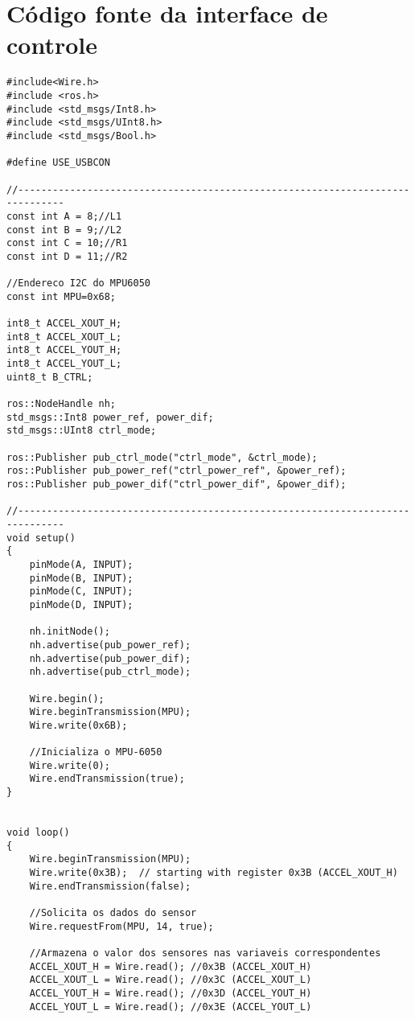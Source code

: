 \chapter{Código fonte da interface de controle}
\label{app:steering_wheel}
	
\lstset{language=C++}
\begin{lstlisting}
#include<Wire.h>
#include <ros.h>
#include <std_msgs/Int8.h>
#include <std_msgs/UInt8.h>
#include <std_msgs/Bool.h>

#define USE_USBCON

//------------------------------------------------------------------------------
const int A = 8;//L1
const int B = 9;//L2
const int C = 10;//R1
const int D = 11;//R2

//Endereco I2C do MPU6050
const int MPU=0x68;

int8_t ACCEL_XOUT_H;
int8_t ACCEL_XOUT_L;
int8_t ACCEL_YOUT_H;
int8_t ACCEL_YOUT_L;
uint8_t B_CTRL;

ros::NodeHandle nh;	
std_msgs::Int8 power_ref, power_dif;
std_msgs::UInt8 ctrl_mode;

ros::Publisher pub_ctrl_mode("ctrl_mode", &ctrl_mode);
ros::Publisher pub_power_ref("ctrl_power_ref", &power_ref);
ros::Publisher pub_power_dif("ctrl_power_dif", &power_dif);

//------------------------------------------------------------------------------
void setup()
{
    pinMode(A, INPUT);
    pinMode(B, INPUT);
    pinMode(C, INPUT);
    pinMode(D, INPUT);

    nh.initNode();
    nh.advertise(pub_power_ref); 
    nh.advertise(pub_power_dif);
    nh.advertise(pub_ctrl_mode);

    Wire.begin();
    Wire.beginTransmission(MPU);
    Wire.write(0x6B);

    //Inicializa o MPU-6050
    Wire.write(0); 
    Wire.endTransmission(true); 
}


void loop()
{
    Wire.beginTransmission(MPU);
    Wire.write(0x3B);  // starting with register 0x3B (ACCEL_XOUT_H)
    Wire.endTransmission(false);
    
    //Solicita os dados do sensor
    Wire.requestFrom(MPU, 14, true); 

    //Armazena o valor dos sensores nas variaveis correspondentes
    ACCEL_XOUT_H = Wire.read(); //0x3B (ACCEL_XOUT_H)
    ACCEL_XOUT_L = Wire.read(); //0x3C (ACCEL_XOUT_L)     
    ACCEL_YOUT_H = Wire.read(); //0x3D (ACCEL_YOUT_H)
    ACCEL_YOUT_L = Wire.read(); //0x3E (ACCEL_YOUT_L)


\end{lstlisting}
